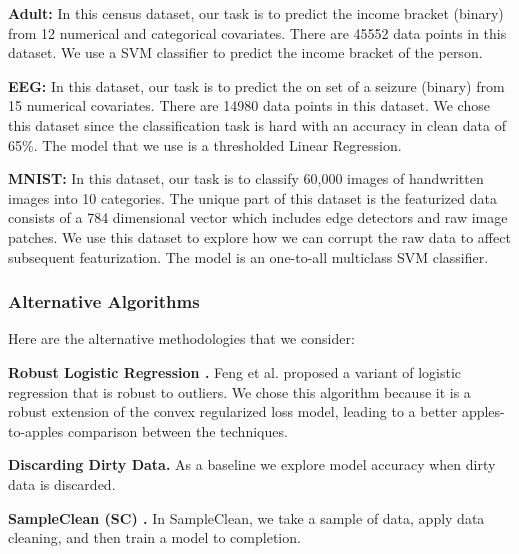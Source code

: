 \vspace{0.5em}

\noindent\textbf{Adult: } In this census dataset, our task is to predict the income bracket (binary) from 12 numerical and categorical covariates. There are 45552 data points in this dataset. We use a SVM classifier to predict the income bracket of the person.

\vspace{0.5em}

\noindent\textbf{EEG: } In this dataset, our task is to predict the on set of a seizure (binary) from 15 numerical covariates. There are 14980 data points in this dataset. We chose this dataset since the classification task is hard with an accuracy in clean data of 65\%. The model that we use is a thresholded Linear Regression.

\vspace{0.5em}

\noindent\textbf{MNIST: } In this dataset, our task is to classify 60,000 images of handwritten images into 10 categories. The unique part of this dataset is the featurized data consists of a 784 dimensional vector which includes edge detectors and raw image patches. We use this dataset to explore how we can corrupt the raw data to affect subsequent featurization. The model is an one-to-all multiclass SVM classifier. 

\subsubsection{Alternative Algorithms}
\noindent Here are the alternative methodologies that we consider:

\vspace{0.5em}

\noindent\textbf{Robust Logistic Regression \cite{feng2014robust}. } Feng et al. proposed a variant of logistic regression that is robust to outliers. We chose this algorithm because it is a robust extension of the convex regularized loss model, leading to a better apples-to-apples comparison between the techniques.  

\vspace{0.5em}

\noindent\textbf{Discarding Dirty Data. } As a baseline we explore model accuracy when dirty data is discarded.

\vspace{0.5em}

\noindent\textbf{SampleClean (SC) \cite{wang1999sample}. } In SampleClean, we take a sample of data, apply data cleaning, and then train a model to completion.

